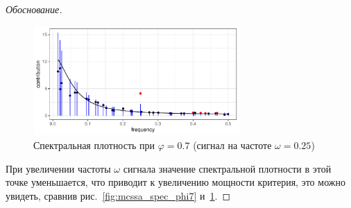 \documentclass[specialist,
substylefile = spbu_report.rtx,
subf,href,colorlinks=true, 12pt]{disser}
\theoremstyle{definition}
\newtheorem{remark}{Замечание}
\begin{document}
\begin{proof}[Обоснование]
\begin{figure}[h]
		\end{figure}
		\begin{figure}[H]
			\centering
			\includegraphics[width=0.7\textwidth]{img/mcssa_spec_phi7_omega025.pdf}
			\caption{Спектральная плотность при $\varphi=0.7$ (сигнал на частоте $\omega=0.25$)}
			\label{fig:mcssa_spec_phi7_omega025}
		\end{figure}
		При увеличении частоты $\omega$ сигнала значение спектральной плотности в этой точке уменьшается, что приводит к увеличению мощности критерия, это можно увидеть, сравнив рис.~\ref{fig:mcssa_spec_phi7} и~\ref{fig:mcssa_spec_phi7_omega025}.
	\end{proof}

\end{document}

